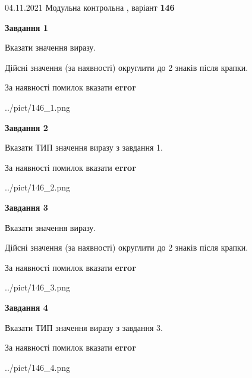 \documentclass[11pt, ukrainian]{article}
\begin{document}
{04.11.2021 Модульна контрольна , варіант  \No \textbf { 146 }\par}
{
\begin {large}
{\begin {center}\textbf{Завдання 1}\end {center}}\par
Вказати значення виразу. \par
Дійсні значення (за наявності) округлити до 2 знаків після крапки. \par
За наявності помилок вказати \textbf{error}

\begin{center}
	{../pict/146_1.png}
\end{center}
\newpage

{\begin {center}\textbf{Завдання 2}\end {center}}\par
Вказати ТИП значення виразу з завдання 1. \par
За наявності помилок вказати \textbf{error}

\begin{center}
	{../pict/146_2.png}
\end{center}
\newpage

{\begin {center}\textbf{Завдання 3}\end {center}}\par
Вказати значення виразу. \par
Дійсні значення (за наявності) округлити до 2 знаків після крапки. \par
За наявності помилок вказати \textbf{error}

\begin{center}
	{../pict/146_3.png}
\end{center}
\newpage

{\begin {center}\textbf{Завдання 4}\end {center}}\par
Вказати ТИП значення виразу з завдання 3. \par
За наявності помилок вказати \textbf{error}

\begin{center}
	{../pict/146_4.png}
\end{center}
\newpage


\end{large}}
\end{document}
